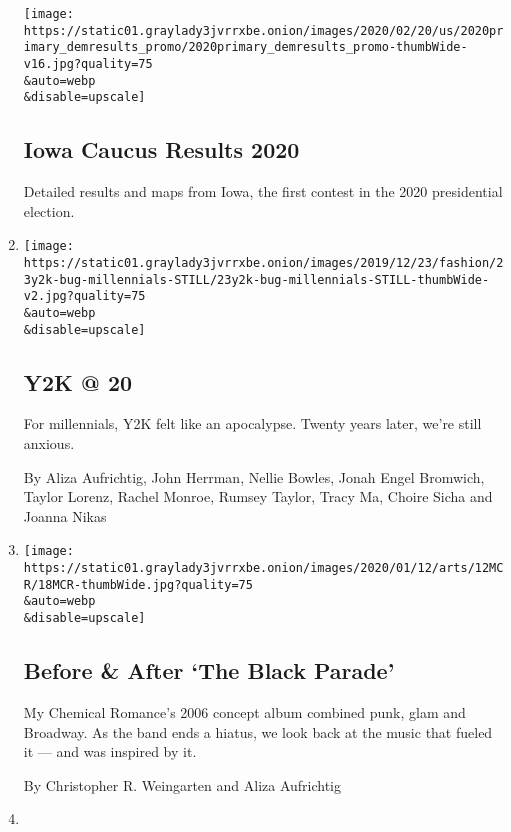 \begin{enumerate}
  \texttt{[image: https://static01.graylady3jvrrxbe.onion/images/2020/02/20/us/2020primary\_demresults\_promo/2020primary\_demresults\_promo-thumbWide-v16.jpg?quality=75\\\&auto=webp\\\&disable=upscale]}

  \hypertarget{iowa-caucus-results-2020}{%
  \subsection{Iowa Caucus Results 2020}\label{iowa-caucus-results-2020}}

  Detailed results and maps from Iowa, the first contest in the 2020
  presidential election.
\item
  \href{/interactive/2019/12/23/style/y2k-bug-millennials.html}{}

  \texttt{[image: https://static01.graylady3jvrrxbe.onion/images/2019/12/23/fashion/23y2k-bug-millennials-STILL/23y2k-bug-millennials-STILL-thumbWide-v2.jpg?quality=75\\\&auto=webp\\\&disable=upscale]}

  \hypertarget{y2k--20}{%
  \subsection{Y2K @ 20}\label{y2k--20}}

  For millennials, Y2K felt like an apocalypse. Twenty years later,
  we're still anxious.

  By Aliza Aufrichtig, John Herrman, Nellie Bowles, Jonah Engel
  Bromwich, Taylor Lorenz, Rachel Monroe, Rumsey Taylor, Tracy Ma,
  Choire Sicha and Joanna Nikas
\item
  \href{/interactive/2019/12/18/arts/music/my-chemical-romance-black-parade.html}{}

  \texttt{[image: https://static01.graylady3jvrrxbe.onion/images/2020/01/12/arts/12MCR/18MCR-thumbWide.jpg?quality=75\\\&auto=webp\\\&disable=upscale]}

  \hypertarget{before--after-the-black-parade}{%
  \subsection{Before \& After `The Black
  Parade'}\label{before--after-the-black-parade}}

  My Chemical Romance's 2006 concept album combined punk, glam and
  Broadway. As the band ends a hiatus, we look back at the music that
  fueled it --- and was inspired by it.

  By Christopher R. Weingarten and Aliza Aufrichtig
\item
  \href{/interactive/2019/11/06/us/politics/elizabeth-warren-policies-taxes.html}{}


\end{enumerate}

